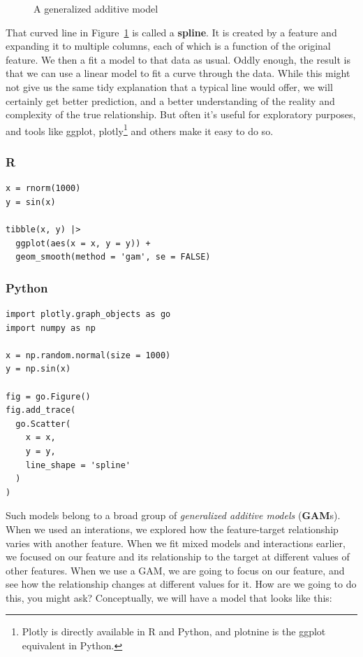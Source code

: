 \documentclass[
  letterpaper,
]{krantz}
\begin{document}
\begin{figure}[H]


\caption{\label{fig-gam-model-line}A generalized additive model}

\end{figure}%

That curved line in Figure~\ref{fig-gam-model-line} is called a
\textbf{spline}. It is created by a feature and expanding it to multiple
columns, each of which is a function of the original feature. We then a
fit a model to that data as usual. Oddly enough, the result is that we
can use a linear model to fit a curve through the data. While this might
not give us the same tidy explanation that a typical line would offer,
we will certainly get better prediction, and a better understanding of
the reality and complexity of the true relationship. But often it's
useful for exploratory purposes, and tools like ggplot,
plotly\footnote{{Plotly} is directly available in R and Python, and
  {plotnine} is the {ggplot} equivalent in Python.} and others make it
easy to do so.

\subsubsection{R}

\begin{verbatim}
x = rnorm(1000)
y = sin(x)

tibble(x, y) |> 
  ggplot(aes(x = x, y = y)) +
  geom_smooth(method = 'gam', se = FALSE) 
\end{verbatim}

\subsubsection{Python}

\begin{verbatim}
import plotly.graph_objects as go
import numpy as np

x = np.random.normal(size = 1000)
y = np.sin(x)

fig = go.Figure()
fig.add_trace(
  go.Scatter(
    x = x, 
    y = y,
    line_shape = 'spline'
  )
)
\end{verbatim}

Such models belong to a broad group of \emph{generalized additive
models} (\textbf{GAM}s). When we used an interations, we explored how
the feature-target relationship varies with another feature. When we fit
mixed models and interactions earlier, we focused on our feature and its
relationship to the target at different values of other features. When
we use a GAM, we are going to focus on our feature, and see how the
relationship changes at different values for it. How are we going to do
this, you might ask? Conceptually, we will have a model that looks like
this:
\end{document}
